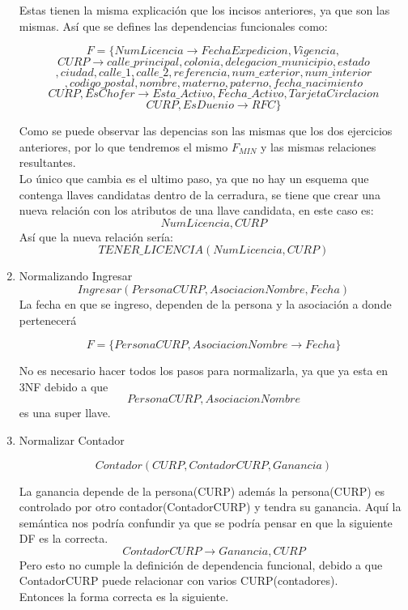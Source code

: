\documentclass{article}
\begin{document}
\begin{enumerate}
			Estas tienen la misma explicación que los incisos anteriores, ya que son las mismas. Así que se defines las dependencias funcionales como:
			
			$$F = \{NumLicencia \rightarrow FechaExpedicion,Vigencia,$$
			$$CURP \rightarrow calle\_principal, colonia, delegacion\_municipio, estado$$ $$,ciudad, calle\_1,calle\_2, referencia, num\_exterior, num\_interior$$
			$$, codigo\_postal, nombre, materno, paterno, fecha\_nacimiento$$
			$$CURP,EsChofer \rightarrow Esta\_Activo, Fecha\_Activo, TarjetaCirclacion$$
			$$CURP,EsDuenio \rightarrow RFC\}$$
			
			Como se puede observar las depencias son las mismas que los dos ejercicios anteriores, por lo que tendremos el mismo $F_{MIN}$ y las mismas relaciones resultantes.\\
			
			Lo único que cambia es el ultimo paso, ya que no hay un esquema que contenga llaves candidatas dentro de la cerradura, se tiene que crear una nueva relación con los atributos de una llave candidata, en este caso es: $$NumLicencia,CURP$$
			Así que la nueva relación sería: $$TENER\_LICENCIA(NumLicencia, CURP)$$

			\item Normalizando Ingresar
			$$Ingresar(PersonaCURP, AsociacionNombre, Fecha)$$						
			La fecha en que se ingreso, dependen de la persona y la asociación a donde pertenecerá
			
			$$F = \{PersonaCURP,AsociacionNombre \rightarrow Fecha\}$$
			
			No es necesario hacer todos los pasos para normalizarla, ya que ya esta en 3NF debido a que $$PersonaCURP, AsociacionNombre$$ es una super llave.
			
			\item Normalizar Contador
			
			$$Contador(CURP, ContadorCURP, Ganancia)$$
			
			La ganancia depende de la persona(CURP) además la persona(CURP) es controlado por otro contador(ContadorCURP) y tendra su ganancia. Aquí la semántica nos podría confundir ya que se podría pensar en que la siguiente DF es la correcta. $$ContadorCURP \rightarrow Ganancia, CURP$$ Pero esto no cumple la definición de dependencia funcional, debido a que ContadorCURP puede relacionar con varios CURP(contadores).\\
			
			Entonces la forma correcta es la siguiente.
			

\end{enumerate}
\end{document}
